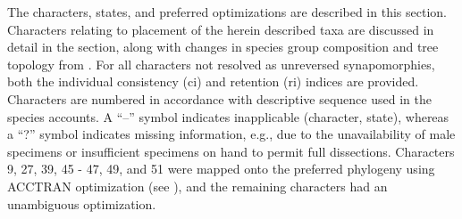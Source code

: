 \documentclass[fleqn,10pt,lineno]{wlpeerj} %
\begin{document}
	The characters, states, and preferred optimizations are described in this section.
	Characters relating to placement of the herein described taxa are discussed in detail in the \textbf{} section, along with changes in species group composition and tree topology from \citet{jansen2015}.
	 For all characters not resolved as unreversed synapomorphies, both the individual consistency (ci) and retention (ri) indices are provided.
	Characters are numbered in accordance with descriptive sequence used in the species accounts.
	A ``–'' symbol indicates inapplicable (character, state), whereas a ``?'' symbol indicates missing information, e.g., due to the unavailability of male specimens or insufficient specimens on hand to permit full dissections.
	Characters 9, 27, 39, 45 - 47, 49, and 51 were mapped onto the preferred phylogeny using ACCTRAN optimization (see \citealt{agnarsson2008}), and the remaining characters had an unambiguous optimization.
	
\end{document}
